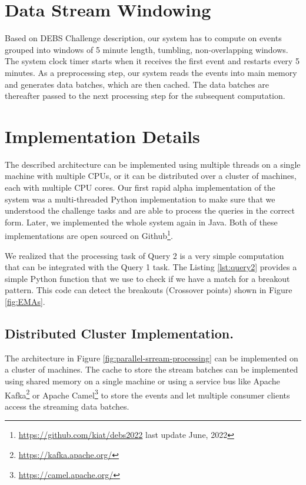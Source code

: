 \section{Data Stream Windowing}\label{sec:windows}
Based on DEBS Challenge \cite{debs2022challenge} description, our system has to compute on events grouped into windows of 5 minute length, tumbling,
non-overlapping windows. The system clock timer starts when it receives the first event and restarts every 5 minutes. As a preprocessing step, our system reads the events
into main memory and generates data batches, which are then cached. The data batches are thereafter passed to the next processing step for the subsequent computation.
    
    
\section{Implementation Details}\label{sec:implementation}
The described architecture can be implemented using multiple threads on a single machine with multiple CPUs, or it can be distributed over a cluster of machines, each with multiple CPU cores.
Our first rapid alpha implementation of the system was a multi-threaded Python implementation to make sure that we understood the challenge tasks and are able to process the queries in the correct form.
Later, we implemented the whole system again in Java. Both of these implementations are open sourced on Github\footnote{\url{https://github.com/kiat/debs2022} last update June, 2022}.


We realized that the processing task of Query 2 is a very simple computation that can be integrated with the Query 1 task.
The Listing \ref{lst:query2} provides a simple Python function that we use to check if we have a match for a breakout pattern.
This code can detect the breakouts (Crossover points) shown in Figure \ref{fig:EMAs}.



\subsection{Distributed Cluster Implementation.}
The architecture in Figure \ref{fig:parallel-srream-processing} can be implemented on a cluster of machines. 
The cache to store the stream batches can be implemented using shared memory on a single machine or using a service bus like 
Apache Kafka\footnote{\url{https://kafka.apache.org/}} or Apache Camel\footnote{\url{https://camel.apache.org/}} to store
the events and let multiple consumer clients access the streaming data batches.

